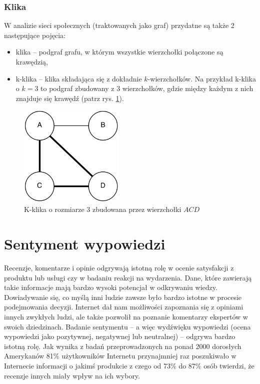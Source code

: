 \subsubsection{Klika}
W analizie sieci społecznych (traktowanych jako graf) przydatne są także 
2 następujące pojęcia:
\begin{itemize}
  \item klika -- podgraf grafu, w którym wszystkie wierzchołki połączone są 
  krawędzią,
  \item k-klika -- klika składająca się z dokładnie $k$-wierzchołków. Na przykład
  k-klika o $k=3$ to podgraf zbudowany z 3 wierzchołków, gdzie między każdym z 
  nich znajduje się krawędź (patrz rys. \ref{image:klika}).
\end{itemize}

\clearpage
\begin{figure}[ht!]
\centering
\includegraphics[width=50mm]{img/klika.png}
\caption{K-klika o rozmiarze 3 zbudowana przez wierzchołki $ACD$}
\label{image:klika}
\end{figure}








\section{Sentyment wypowiedzi}
Recenzje, komentarze i opinie odgrywają istotną rolę w ocenie satysfakcji
z produktu lub usługi czy w badaniu reakcji na wydarzenia. Dane, które zawierają
takie informacje mają bardzo wysoki potencjał w odkrywaniu wiedzy.
Dowiadywanie się, co myślą inni ludzie zawsze było bardzo istotne w procesie
podejmowania decyzji. Internet dał nam możliwości zapoznania się z opiniami
innych zwykłych ludzi, ale także pozwolił na poznanie komentarzy 
ekspertów w swoich dziedzinach. Badanie sentymentu -- a więc wydźwięku
wypowiedzi (ocena wypowiedzi jako pozytywnej, negatywnej lub neutralnej)
-- odgrywa bardzo istotną rolę. Jak wynika z badań przeprowadzonych na ponad
2000 dorosłych Amerykanów \cite{pangLee} 81\% użytkowników Internetu
przynajmniej raz poszukiwało w Internecie informacji o jakimś produkcie
z czego od 73\% do 87\% osób twierdzi, że recenzje innych miały wpływ
na ich wybory.

